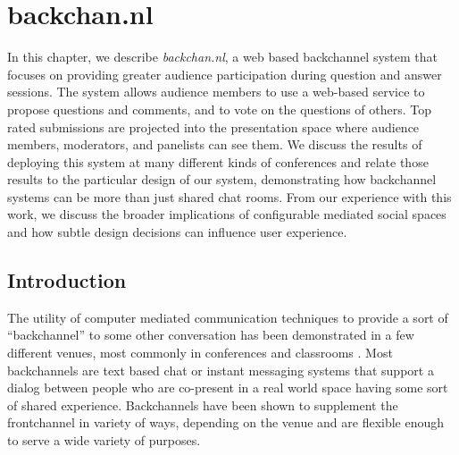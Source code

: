 \chapter{backchan.nl}
\label{ch:backchannl}

In this chapter, we describe \emph{backchan.nl}, a web based backchannel system that focuses on providing greater audience participation during question and answer sessions. The system allows audience members to use a web-based service to propose questions and comments, and to vote on the questions of others. Top rated submissions are projected into the presentation space where audience members, moderators, and panelists can see them. We discuss the results of deploying this system at many different kinds of conferences and relate those results to the particular design of our system, demonstrating how backchannel systems can be more than just shared chat rooms. From our experience with this work, we discuss the broader implications of configurable mediated social spaces and how subtle design decisions can influence user experience.

\section{Introduction}
The utility of computer mediated communication techniques to provide a sort of ``backchannel'' to some other conversation has been demonstrated in a few different venues, most commonly in conferences \citep{mccarthy_digital_2004, Rekimoto:1998jy} and classrooms \citep{Cogdill:2001fp, Yardi:2006uk}. Most backchannels are text based chat or instant messaging systems that support a dialog between people who are co-present in a real world space having some sort of shared experience. Backchannels have been shown to supplement the frontchannel in variety of ways, depending on the venue and are flexible enough to serve a wide variety of purposes.

